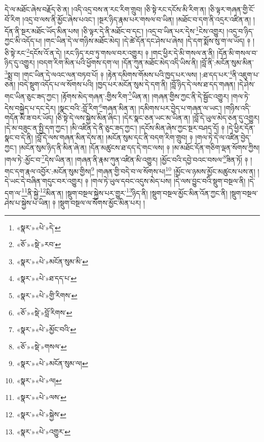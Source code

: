 དེ་ལ་མཐོང་ཞེས་བརྗོད་ཅེ་ན། །འདི་འདྲ་བས་ན་རང་རིག་གྲུབ། །ཅི་སྟེ་རང་དངོས་མི་རིག་ན། །ཅི་ལྟར་གཞན་གྱི་ངོ་བོ་རིག །འདྲ་བ་ལས་ནི་མྱོང་ཞེས་པའང་། །སྔར་ཉིད་རྣམ་པར་གསལ་བ་ཡིན། །མཐོང་བ་དག་ནི་འདྲར་འཛིན་ན། །དོན་ནི་སྔར་མཐོང་ཡོད་མིན་པས། །ཅི་ལྟར་དེ་ནི་མཐོང་བ་དང་། །འདྲ་བ་ཡིན་པར་དེས་\footnote{«སྣར་»«པེ་»དེ་}ངེས་འགྱུར། །འདྲ་བ་ཉིད་ཀྱང་མི་འདོད་པ། །གང་ཡིན་དེ་ལ་གཉིས་མཐོང་མེད། །དེ་ཚེ་དོན་དང་ཤེས་པ་ཞེས། །དེ་དག་སྨོས་སུ་ག་ལ་ཡོད། ༈ །ཅི་སྟེ་རང་\footnote{«ཅོ་»«སྡེ་»རབ་}དངོས་འོ་ན་དེ། །རང་ཉིད་རབ་ཏུ་གསལ་བར་འགྱུར། ༈ །གང་ཕྱིར་དེ་མི་གསལ་ན་ནི། །དོན་མི་གསལ་བ་ཉིད་དུ་འགྱུར། །བདག་རིག་མིན་པའི་ཕྱོགས་དག་ལ། །དོན་ཀུན་མཐོང་མེད་འདི་ཡིས་ནི། །བློ་ནི་:མངོན་སུམ་མིན་\footnote{«སྣར་»«པེ་»མངོན་སུམ་མི་}སྨྲ་བ། །གང་ཡིན་དེ་ལའང་ལན་བཏབ་པོ། ༈ །རྟེན་དམིགས་གོམས་པའི་ཁྱད་པར་ལས། །:ཐ་དད་པར་\footnote{«སྣར་»«པེ་»ཐ་དད་པ་}ནི་འཇུག་པ་ཅན། །བདེ་སྡུག་འདོད་པ་ལ་སོགས་པའི། །ཁྱད་པར་མངོན་སུམ་དེ་དག་ནི། །བློ་ཉིད་དེ་ལས་ཐ་དད་གཞན། །དེ་ཤེས་གང་ཡིན་ཅུང་ཟད་ཀྱང་། །རྟོགས་མེད་གཞན་:གྱིས་རིག་\footnote{«སྣར་»«པེ་»གྱི་རིགས་}ཡིན་ན། །གཞན་གྱིས་ཀྱང་ནི་དེ་སྦྱོང་འགྱུར། །གལ་ཏེ་དེས་བསྐྱེད་པ་དང་དེར། །སྣང་བའི་:བློ་རིག་\footnote{«ཅོ་»«སྡེ་»བློ་རིགས་}གཞན་མིན་ན། །དམིགས་པར་བྱེད་པ་གཞན་ལ་ཡང་། །གཉིས་འདི་གདོན་མི་ཟ་བར་ཡོད། །ཅི་སྟེ་དེ་ལས་སྐྱེས་མིན་ཞིང་། །དེར་སྣང་ཅན་ཡང་མ་ཡིན་ན། །བློ་དེ་ཡུལ་མེད་ཅན་དུ་འགྱུར། །དེ་མ་བཟུང་ན་སྤྱི་དག་ཀྱང་། །མི་འཛིན་དེ་ནི་ཅུང་ཟད་ཀྱང་། །དངོས་མིན་ཞེས་ཀྱང་སྔར་བཤད་དོ། ༈ །དེ་ཕྱིར་དོན་སྣང་བ་དེ་ནི། །བློ་དེ་ལས་གཞན་མིན་དེས་ན། །མངོན་སུམ་དང་ནི་བདག་རིག་གྲུབ། ༈ །གལ་ཏེ་དེ་ལ་འཛིན་བྱེད་ཀྱང་། །མངོན་སུམ་ཉིད་ནི་མིན་ཞེ་ན། །དོན་མཚུངས་ཐ་དད་དེ་གང་ལས། ༈ །མ་མཐོང་དོན་གཅིག་ལྡན་སོགས་ཀྱིས། །གལ་ཏེ་:མྱོང་བ་\footnote{«སྣར་»«པེ་»མྱོང་བའི་}དེས་ཡིན་ན། །གཞན་ནི་རྣམ་ཀུན་འཛིན་མི་འགྱུར། །མྱོང་བའི་དབྱེ་བའང་བསལ་\footnote{«ཅོ་»«སྡེ་»གསལ་}ཟིན་ཏོ། ༈ །གང་དག་རྣལ་འབྱོར་:མངོན་སུམ་གྱིས།\footnote{«སྣར་»«པེ་»མངོན་སུམ་ལ།} །གཞན་གྱི་བདེ་བ་ལ་སོགས་པ།\footnote{«སྣར་»«པེ་»ལ།} །མྱོང་ལ་ཉམས་མྱོང་མཚུངས་པས་ན། །དེ་ཡང་དེ་བཞིན་གདུང་བར་འགྱུར། ༈ །གལ་ཏེ་ཡུལ་དབང་འདུས་མེད་པས། །དེ་ལས་བྱུང་བའི་སྡུག་བསྔལ་ནི། །དེ་དག་ལ་\footnote{«སྣར་»«པེ་»ལས་}ནི་སྐྱེ་\footnote{«སྣར་»«པེ་»སྐྱེས་}མིན་ན། །སྡུག་བསྔལ་སྐྱེས་པར་གྱུར་\footnote{«སྣར་»«པེ་»འགྱུར་}ཉིད་ནི། །སྡུག་བསྔལ་མྱོང་མིན་འོན་ཀྱང་ནི། །སྡུག་བསྔལ་ཤེས་པ་སྐྱེས་པ་ཡིན། ༈ །སྡུག་བསྔལ་ལ་སོགས་མྱོང་མིན་པར། །
